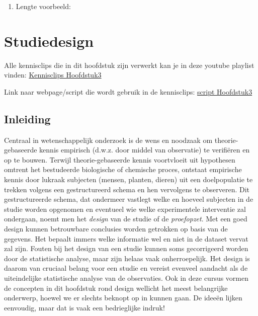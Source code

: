 \documentclass[
  12pt,dutch,coursenotes]{book}
\providecommand{\tightlist}{%
  \setlength{\itemsep}{0pt}\setlength{\parskip}{0pt}}
\theoremstyle{definition}
\theoremstyle{definition}
\theoremstyle{definition}
\theoremstyle{definition}
\theoremstyle{remark}
\begin{document}
\begin{enumerate}
\def\labelenumi{\arabic{enumi}.}
\setcounter{enumi}{1}
\tightlist
\item
  Lengte voorbeeld:
\end{enumerate}

\hypertarget{chap-design}{%
\chapter{Studiedesign}\label{chap-design}}

Alle kennisclips die in dit hoofdstuk zijn verwerkt kan je in deze youtube playlist vinden: \href{https://www.youtube.com/playlist?list=PLZH1hP8_LbJL1GjhnpEDlx78OJ6qUzSix}{Kennisclips Hoofdstuk3}

Link naar webpage/script die wordt gebruik in de kennisclips: \href{https://statomics.github.io/sbc21/rmd/03-experimentalDesign.html}{script Hoofdstuk3}

\hypertarget{inleiding-2}{%
\section{Inleiding}\label{inleiding-2}}

Centraal in wetenschappelijk onderzoek is de wens en noodzaak om
theorie-gebaseerde kennis empirisch (d.w.z. door middel van observatie) te
verifiëren en op te bouwen. Terwijl theorie-gebaseerde kennis voortvloeit uit hypothesen
omtrent het bestudeerde biologische of chemische proces, ontstaat empirische
kennis door lukraak subjecten (mensen, planten, dieren) uit een doelpopulatie te
trekken volgens een gestructureerd schema en hen vervolgens te observeren.
Dit gestructureerde schema, dat ondermeer vastlegt welke en hoeveel
subjecten in de studie worden opgenomen en eventueel wie welke experimentele
interventie zal ondergaan, noemt men het \emph{design} van de studie of de
\emph{proefopzet}. Met een goed design kunnen betrouwbare conclusies
worden getrokken op basis van de gegevens. Het bepaalt immers welke
informatie wel en niet in de dataset vervat zal zijn. Fouten bij het design
van een studie kunnen soms gecorrigeerd worden door de statistische analyse,
maar zijn helaas vaak onherroepelijk. Het design is daarom van cruciaal
belang voor een studie en vereist evenveel aandacht als de uiteindelijke
statistische analyse van de observaties. Ook in deze cursus vormen de
concepten in dit hoofdstuk rond design wellicht het meest
belangrijke onderwerp, hoewel we er slechts beknopt op in kunnen gaan. De
ideeën lijken eenvoudig, maar dat is vaak een bedrieglijke indruk!
\end{document}
